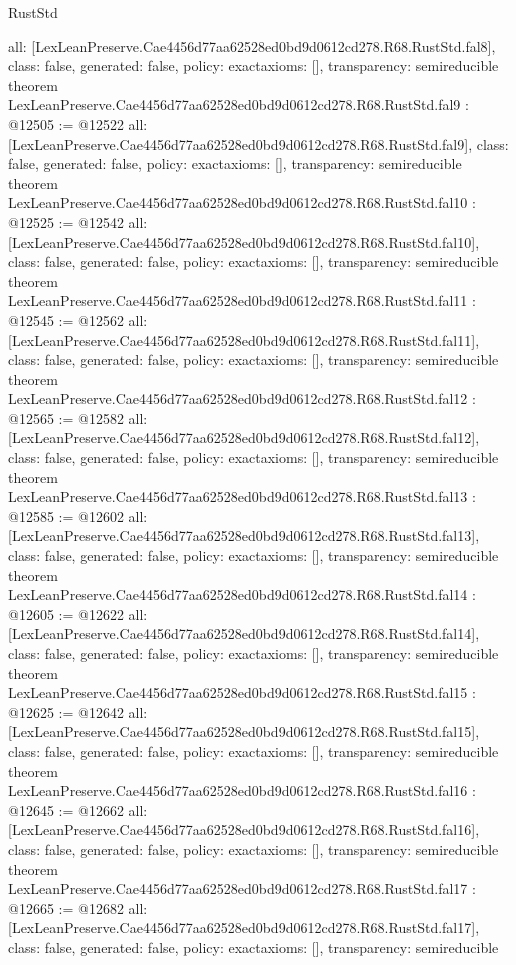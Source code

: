 \begin{lexlean}{RustStd}
\begin{coremodule}
{  all: [LexLeanPreserve.Cae4456d77aa62528ed0bd9d0612cd278.R68.RustStd.fal8],
  class: false,
  generated: false,
  policy: exact{axioms: []},
  transparency: semireducible
}
theorem LexLeanPreserve.Cae4456d77aa62528ed0bd9d0612cd278.R68.RustStd.fal9 : @12505 := @12522 {
  all: [LexLeanPreserve.Cae4456d77aa62528ed0bd9d0612cd278.R68.RustStd.fal9],
  class: false,
  generated: false,
  policy: exact{axioms: []},
  transparency: semireducible
}
theorem LexLeanPreserve.Cae4456d77aa62528ed0bd9d0612cd278.R68.RustStd.fal10 : @12525 := @12542 {
  all: [LexLeanPreserve.Cae4456d77aa62528ed0bd9d0612cd278.R68.RustStd.fal10],
  class: false,
  generated: false,
  policy: exact{axioms: []},
  transparency: semireducible
}
theorem LexLeanPreserve.Cae4456d77aa62528ed0bd9d0612cd278.R68.RustStd.fal11 : @12545 := @12562 {
  all: [LexLeanPreserve.Cae4456d77aa62528ed0bd9d0612cd278.R68.RustStd.fal11],
  class: false,
  generated: false,
  policy: exact{axioms: []},
  transparency: semireducible
}
theorem LexLeanPreserve.Cae4456d77aa62528ed0bd9d0612cd278.R68.RustStd.fal12 : @12565 := @12582 {
  all: [LexLeanPreserve.Cae4456d77aa62528ed0bd9d0612cd278.R68.RustStd.fal12],
  class: false,
  generated: false,
  policy: exact{axioms: []},
  transparency: semireducible
}
theorem LexLeanPreserve.Cae4456d77aa62528ed0bd9d0612cd278.R68.RustStd.fal13 : @12585 := @12602 {
  all: [LexLeanPreserve.Cae4456d77aa62528ed0bd9d0612cd278.R68.RustStd.fal13],
  class: false,
  generated: false,
  policy: exact{axioms: []},
  transparency: semireducible
}
theorem LexLeanPreserve.Cae4456d77aa62528ed0bd9d0612cd278.R68.RustStd.fal14 : @12605 := @12622 {
  all: [LexLeanPreserve.Cae4456d77aa62528ed0bd9d0612cd278.R68.RustStd.fal14],
  class: false,
  generated: false,
  policy: exact{axioms: []},
  transparency: semireducible
}
theorem LexLeanPreserve.Cae4456d77aa62528ed0bd9d0612cd278.R68.RustStd.fal15 : @12625 := @12642 {
  all: [LexLeanPreserve.Cae4456d77aa62528ed0bd9d0612cd278.R68.RustStd.fal15],
  class: false,
  generated: false,
  policy: exact{axioms: []},
  transparency: semireducible
}
theorem LexLeanPreserve.Cae4456d77aa62528ed0bd9d0612cd278.R68.RustStd.fal16 : @12645 := @12662 {
  all: [LexLeanPreserve.Cae4456d77aa62528ed0bd9d0612cd278.R68.RustStd.fal16],
  class: false,
  generated: false,
  policy: exact{axioms: []},
  transparency: semireducible
}
theorem LexLeanPreserve.Cae4456d77aa62528ed0bd9d0612cd278.R68.RustStd.fal17 : @12665 := @12682 {
  all: [LexLeanPreserve.Cae4456d77aa62528ed0bd9d0612cd278.R68.RustStd.fal17],
  class: false,
  generated: false,
  policy: exact{axioms: []},
  transparency: semireducible
}
\end{coremodule}
\end{lexlean}
